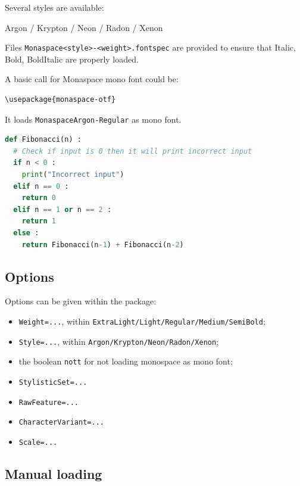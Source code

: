 \documentclass[a4paper]{scrartcl}
\newcommand*{\file}[1]{\texttt{#1}}
\newcommand*{\opt}[1]{\texttt{#1}}
\begin{document}
Several styles are available:

\hfill{\monaspaceargon Argon} / {\monaspacekrypton Krypton} / {\monaspaceneon Neon} / {\monaspaceradon Radon} / {\monaspacexenon Xenon}\hfill\null

\smallskip

Files \file{Monaspace<style>-<weight>.fontspec} are provided to ensure that Italic, Bold, BoldItalic are properly loaded.

\smallskip

A basic call for Monaspace mono font could be:

\begin{verbatim}
\usepackage{monaspace-otf}
\end{verbatim}

It loads \opt{MonaspaceArgon-Regular} as mono font.

\medskip

\begin{lstlisting}[language=python,basicstyle=\footnotesize\ttfamily,commentstyle=\itshape\color{gray},keywordstyle=\bfseries\color{magenta},tabsize=4,frame=single]
def Fibonacci(n) :
  # Check if input is 0 then it will print incorrect input
  if n < 0 :
    print("Incorrect input")
  elif n == 0 :
    return 0
  elif n == 1 or n == 2 :
    return 1
  else :
    return Fibonacci(n-1) + Fibonacci(n-2)
\end{lstlisting}

\subsection{Options}

Options can be given within the package:

\begin{itemize}
	\item \opt{Weight=...}, within {\footnotesize \opt{ExtraLight/Light/Regular/Medium/SemiBold}};
	\item \opt{Style=...}, within {\footnotesize \opt{Argon/Krypton/Neon/Radon/Xenon}};
	\item the boolean \opt{nott} for not loading monospace as mono font;
	\item \opt{StylisticSet=...}
	\item \opt{RawFeature=...}
	\item \opt{CharacterVariant=...}
	\item \opt{Scale=...}
\end{itemize}

\subsection{Manual loading}
\end{document}
